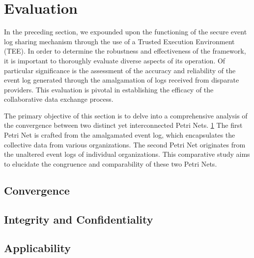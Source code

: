\section{Evaluation}
\label{sec:evaluation}
In the preceding section, we expounded upon the functioning of the secure event log sharing mechanism through the use of a Trusted Execution Environment (TEE). In order to determine the robustness and effectiveness of the framework, it is important to thoroughly evaluate diverse aspects of its operation.
Of particular significance is the assessment of the accuracy and reliability of the event log generated through the amalgamation of logs received from disparate providers. This evaluation is pivotal in establishing the efficacy of the collaborative data exchange process.

The primary objective of this section is to delve into a comprehensive analysis of the convergence between two distinct yet interconnected Petri Nets. \cref{sec:evaluation} The first Petri Net is crafted from the amalgamated event log, which encapsulates the collective data from various organizations. The second Petri Net originates from the unaltered event logs of individual organizations. This comparative study aims to elucidate the congruence and comparability of these two Petri Nets.

\subsection{Convergence}


\subsection{Integrity and Confidentiality}



\subsection{Applicability}






